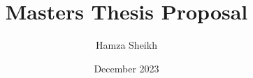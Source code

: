 \documentclass{article}
\title{Masters Thesis Proposal}
\author{Hamza Sheikh}
\date{December 2023}
\begin{document}
\maketitle

\tableofcontents
\break









\end{document}
